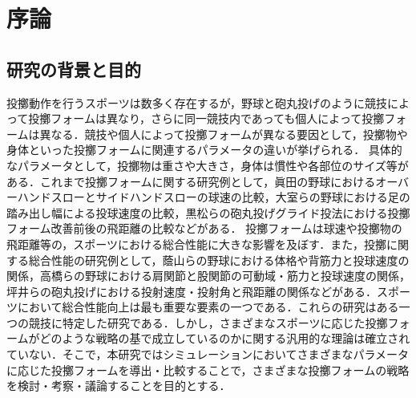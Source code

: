 \chapter[序論]%
        {序論}
        \section{研究の背景と目的}
        投擲動作を行うスポーツは数多く存在するが，野球と砲丸投げのように競技によって投擲フォームは異なり，さらに同一競技内であっても個人によって投擲フォームは異なる．競技や個人によって投擲フォームが異なる要因として，投擲物や身体といった投擲フォームに関連するパラメータの違いが挙げられる．
        具体的なパラメータとして，投擲物は重さや大きさ，身体は慣性や各部位のサイズ等がある．これまで投擲フォームに関する研究例として，眞田の野球におけるオーバーハンドスローとサイドハンドスローの球速の比較\cite{sanada}，大室らの野球における足の踏み出し幅による投球速度の比較\cite{omura}，黒松らの砲丸投げグライド投法における投擲フォーム改善前後の飛距離の比較\cite{kuromatsu}などがある．
        投擲フォームは球速や投擲物の飛距離等の，スポーツにおける総合性能に大きな影響を及ぼす．また，投擲に関する総合性能の研究例として，蔭山らの野球における体格や背筋力と投球速度の関係\cite{kageyama}，高橋らの野球における肩関節と股関節の可動域・筋力と投球速度の関係\cite{takahashi}，坪井らの砲丸投げにおける投射速度・投射角と飛距離の関係\cite{tsuboi}などがある．スポーツにおいて総合性能向上は最も重要な要素の一つである．これらの研究はある一つの競技に特定した研究である．しかし，さまざまなスポーツに応じた投擲フォームがどのような戦略の基で成立しているのかに関する汎用的な理論は確立されていない．そこで，本研究ではシミュレーションにおいてさまざまなパラメータに応じた投擲フォームを導出・比較することで，さまざまな投擲フォームの戦略を検討・考察・議論することを目的とする．\\


